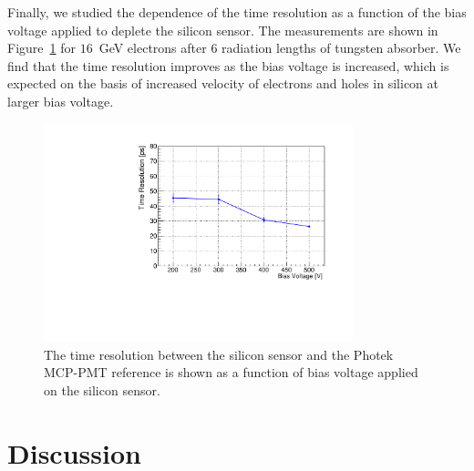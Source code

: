 \documentclass[12pt]{article}
\begin{document}
{Finally, we studied the dependence of the time resolution as a function of the
bias voltage applied to deplete the silicon sensor. The measurements are shown
in Figure~\ref{fig:SigmaT_vs_DV_lin30Stamp} for $16$~GeV electrons after
6 radiation lengths of tungsten absorber. We find that the time resolution
improves as the bias voltage is increased, which is expected on the basis of 
increased velocity of electrons and holes in silicon at larger bias voltage. 

\begin{figure}[htbp] 
\centering
\includegraphics[width=0.8\textwidth]{plots/SigmaT_vs_DV_lin30Stamp.pdf} 
\caption{The time resolution between the silicon sensor and the Photek MCP-PMT 
reference is shown as a function of bias voltage applied on the silicon sensor. } 
\label{fig:SigmaT_vs_DV_lin30Stamp} 
\end{figure} 

\section{Discussion} 
\label{sec:discussion} 

}
\end{document}
